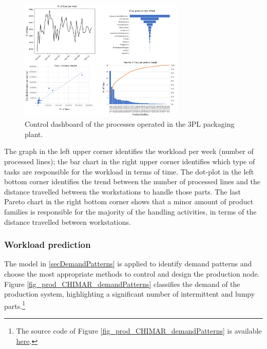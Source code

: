 \begin{figure}[hbt!]
\centering
\includegraphics[width=0.7\textwidth]{sectionProduction/control_figures/fig_prod_CHIMAR_performance.png}
\captionsetup{type=figure}
\caption{Control dashboard of the processes operated in the 3PL packaging plant.}
\label{fig_prod_CHIMAR_performance}
\end{figure}

The graph in the left upper corner identifies the workload per week (number of processed lines); the bar chart in the right upper corner identifies which type of tasks are responsible for the workload in terms of time. The dot-plot in the left bottom corner identifies the trend between the number of processed lines and the distance travelled between the workstations to handle those parts. The last Pareto chart in the right bottom corner shows that a minor amount of product families is responsible for the majority of the handling activities, in terms of the distance travelled between workstations.

\subsubsection{Workload prediction}

The model in \ref{secDemandPatterns} is applied to identify demand patterns and choose the most appropriate methods to control and design the production node. Figure \ref{fig_prod_CHIMAR_demandPatterns} classifies the demand of the production system, highlighting a significant number of intermittent and lumpy parts.\footnote{The source code of Figure \ref{fig_prod_CHIMAR_demandPatterns} is available \href{https://github.com/aletuf93/logproj/blob/master/examples/PROD_02\%20Demand\%20patterns.ipynb}{here}.}

